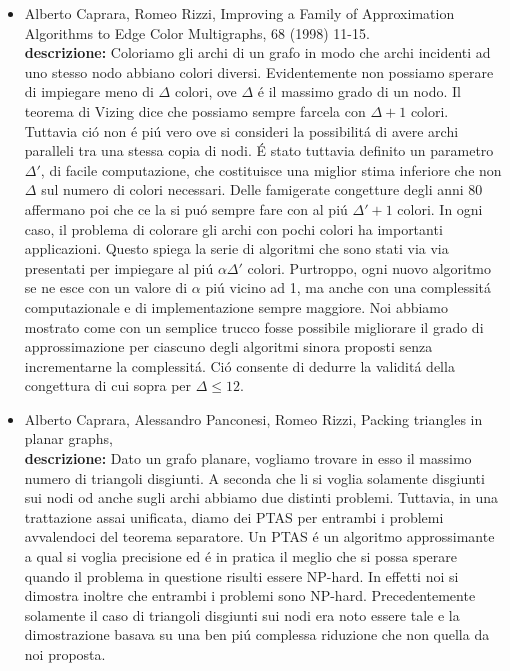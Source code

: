 \documentclass[10pt]{article}
\begin{document}
\begin{itemize}
  \vspace{1.4mm}
  \item[] {\sc Alberto Caprara, Romeo Rizzi},  
   \newblock  Improving a Family of Approximation
              Algorithms to Edge Color Multigraphs,
    68 (1998) 11-15.\\
{\bf descrizione:}
Coloriamo gli archi di un grafo
in modo che archi incidenti ad uno stesso nodo
abbiano colori diversi.
Evidentemente non possiamo sperare di impiegare
meno di $\Delta$ colori,
ove $\Delta$ \'e il massimo grado di un nodo.
Il teorema di Vizing dice che
possiamo sempre farcela
con $\Delta+1$ colori.
Tuttavia ci\'o non \'e pi\'u vero
ove si consideri la possibilit\'a di avere archi paralleli
tra una stessa copia di nodi.
\'E stato tuttavia definito
un parametro $\Delta'$,
di facile computazione,
che costituisce una miglior stima inferiore
che non $\Delta$ sul numero di colori necessari.
Delle famigerate congetture
degli anni 80
affermano poi che ce la si pu\'o sempre
fare con al pi\'u $\Delta'+1$ colori.
In ogni caso,
il problema di colorare
gli archi con pochi colori ha importanti applicazioni.
Questo spiega la serie di algoritmi che sono stati
via via presentati per impiegare al pi\'u
$\alpha \Delta'$ colori.
Purtroppo, ogni nuovo algoritmo se ne esce
con un valore di $\alpha$ pi\'u vicino ad 1,
ma anche con una complessit\'a computazionale
e di implementazione sempre maggiore.
Noi abbiamo mostrato come con un semplice trucco fosse possibile
migliorare il grado di approssimazione per ciascuno
degli algoritmi sinora proposti senza incrementarne
la complessit\'a.
Ci\'o consente di dedurre la validit\'a della congettura
di cui sopra per $\Delta\leq 12$.\\

  \vspace{1.4mm}
  \item[] {\sc Alberto Caprara, Alessandro Panconesi, Romeo Rizzi},
   \newblock  Packing triangles in planar graphs,
   \\
{\bf descrizione:}
Dato un grafo planare,
vogliamo trovare in esso il massimo numero di triangoli disgiunti.
A seconda che li si voglia solamente disgiunti sui nodi od
anche sugli archi abbiamo due distinti problemi.
Tuttavia, in una trattazione assai unificata,
diamo dei PTAS per entrambi i problemi
avvalendoci del teorema separatore.
Un PTAS \'e un algoritmo approssimante
a qual si voglia precisione
ed \'e in pratica il meglio che si possa sperare
quando il problema in questione
risulti essere NP-hard.
In effetti noi si dimostra inoltre che entrambi i problemi sono
NP-hard.
Precedentemente solamente il caso di triangoli disgiunti
sui nodi era noto essere tale e la dimostrazione
basava su una ben pi\'u complessa riduzione
che non quella da noi proposta.\\


\end{itemize}
\end{document}
